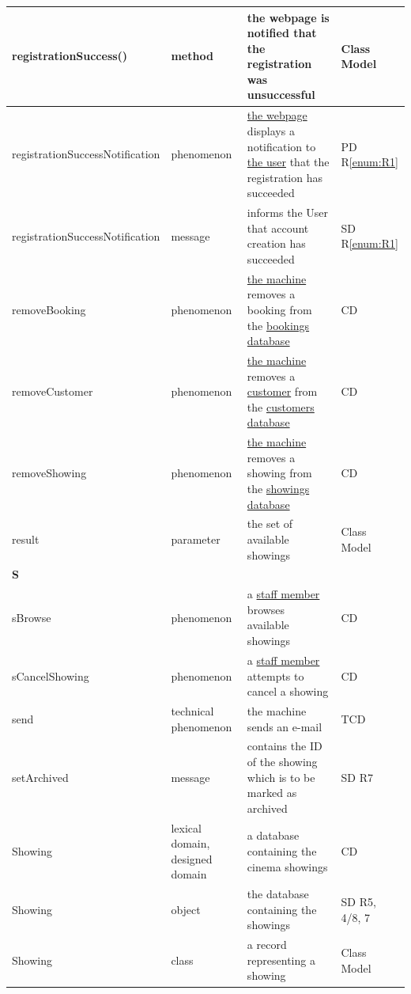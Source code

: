 \documentclass[a4paper,10pt,titlepage,bibtotoc,bibtotocnumbered]{scrreprt}
\begin{document}
\begin{longtable}{|p{4.75cm}|p{3cm}|p{5cm}|l|}
\hline
registrationSuccess() & method & the webpage is notified that the registration was unsuccessful & Class Model\\
\hline
\hypertarget{glossary:registrationSuccessNotification}{registrationSuccessNotification} & phenomenon & \hyperlink{glossary:WebpageRegisterCustomer}{the webpage} displays a notification to \hyperlink{glossary:User}{the user} that the registration has succeeded & PD R\ref{enum:R1}\\
\hline
registrationSuccessNotification & message & informs the User that account creation has succeeded & SD R\ref{enum:R1}\\
\hline
\hypertarget{glossary:removeBooking}{removeBooking} & phenomenon &  \hyperlink{glossary:UDEKino}{the machine} removes a booking from the \hyperlink{glossary:Booking}{bookings database} & CD\\
\hline
\hypertarget{glossary:removeBooking}{removeCustomer} & phenomenon &  \hyperlink{glossary:UDEKino}{the machine} removes a \hyperlink{glossary:Customer}{customer} from the \hyperlink{glossary:CustomerAccount}{customers database} & CD\\
\hline
\hypertarget{glossary:removeShowing}{removeShowing} & phenomenon &  \hyperlink{glossary:UDEKino}{the machine} removes a showing from the \hyperlink{glossary:Showing}{showings database} & CD\\
\hline
result & parameter & the set of available showings & Class Model\\
\hline
\multicolumn{4}{|l|}{\textbf{S}}\\
\hline
\hypertarget{glossary:sBrowse}{sBrowse} & phenomenon & a \hyperlink{glossary:StaffMember}{staff member} browses available showings & CD\\
\hline
\hypertarget{glossary:sCancelShowing}{sCancelShowing} & phenomenon & a \hyperlink{glossary:StaffMember}{staff member} attempts to cancel a showing & CD\\
\hline
send & technical phenomenon & the machine sends an e-mail & TCD\\
\hline
setArchived & message & contains the ID of the showing which is to be marked as archived & SD R7\\
\hline
\hypertarget{glossary:Showing}{Showing} & lexical domain, designed domain & a database containing the cinema showings & CD\\
\hline
Showing & object & the database containing the showings & SD R5, 4/8, 7\\
\hline
Showing & class & a record representing a showing & Class Model\\

\end{longtable}
\end{document}
